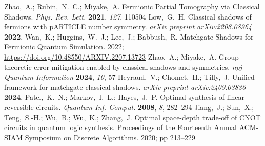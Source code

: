 \documentclass[journal=jctcce,a4paper,manuscript=article]{achemso}
\begin{document}
\begin{mcitethebibliography}{41}
  \mciteBstWouldAddEndPuncttrue
  \mciteSetBstMidEndSepPunct{\mcitedefaultmidpunct}
  {\mcitedefaultendpunct}{\mcitedefaultseppunct}\relax
  \EndOfBibitem
  Zhao,~A.; Rubin,~N.~C.; Miyake,~A. Fermionic Partial Tomography via Classical Shadows. \emph{Phys. Rev. Lett.} \textbf{2021}, \emph{127}, 110504\relax
  \mciteBstWouldAddEndPuncttrue
  \mciteSetBstMidEndSepPunct{\mcitedefaultmidpunct}
  {\mcitedefaultendpunct}{\mcitedefaultseppunct}\relax
  \EndOfBibitem
  Low,~G.~H. Classical shadows of fermions with pARTICLE number symmetry. \emph{arXiv preprint arXiv:2208.08964} \textbf{2022}, \relax
  \mciteBstWouldAddEndPunctfalse
  \mciteSetBstMidEndSepPunct{\mcitedefaultmidpunct}
  {}{\mcitedefaultseppunct}\relax
  \EndOfBibitem
  Wan,~K.; Huggins,~W.~J.; Lee,~J.; Babbush,~R. Matchgate Shadows for Fermionic Quantum Simulation. 2022; \url{https://doi.org/10.48550/ARXIV.2207.13723}\relax
  \mciteBstWouldAddEndPuncttrue
  \mciteSetBstMidEndSepPunct{\mcitedefaultmidpunct}
  {\mcitedefaultendpunct}{\mcitedefaultseppunct}\relax
  \EndOfBibitem
  Zhao,~A.; Miyake,~A. Group-theoretic error mitigation enabled by classical shadows and symmetries. \emph{npj Quantum Information} \textbf{2024}, \emph{10}, 57\relax
  \mciteBstWouldAddEndPuncttrue
  \mciteSetBstMidEndSepPunct{\mcitedefaultmidpunct}
  {\mcitedefaultendpunct}{\mcitedefaultseppunct}\relax
  \EndOfBibitem
  Heyraud,~V.; Chomet,~H.; Tilly,~J. Unified framework for matchgate classical shadows. \emph{arXiv preprint arXiv:2409.03836} \textbf{2024}, \relax
  \mciteBstWouldAddEndPunctfalse
  \mciteSetBstMidEndSepPunct{\mcitedefaultmidpunct}
  {}{\mcitedefaultseppunct}\relax
  \EndOfBibitem
  Patel,~K.~N.; Markov,~I.~L.; Hayes,~J.~P. Optimal synthesis of linear reversible circuits. \emph{Quantum Inf. Comput.} \textbf{2008}, \emph{8}, 282--294\relax
  \mciteBstWouldAddEndPuncttrue
  \mciteSetBstMidEndSepPunct{\mcitedefaultmidpunct}
  {\mcitedefaultendpunct}{\mcitedefaultseppunct}\relax
  \EndOfBibitem
  Jiang,~J.; Sun,~X.; Teng,~S.-H.; Wu,~B.; Wu,~K.; Zhang,~J. Optimal space-depth trade-off of CNOT circuits in quantum logic synthesis. Proceedings of the Fourteenth Annual ACM-SIAM Symposium on Discrete Algorithms. 2020; pp 213--229\relax

\end{mcitethebibliography}
\end{document}
